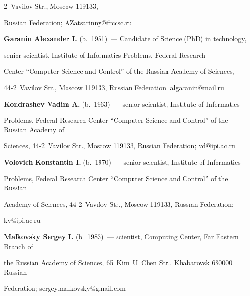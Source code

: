 2~Vavilov Str., Moscow 119133, 

Russian Federation; \mbox{AZatsarinny@frccsc.ru}



\vspace*{3pt}



\noindent

\textbf{Garanin Alexander I.} (b.\ 1951)~--- Candidate of Science (PhD) in technology, 

senior scientist, Institute of Informatics Problems, Federal Research 

Center ``Computer Science and Control'' of the Russian Academy of Sciences, 

 44-2~Vavilov Str., Moscow 119133, Russian Federation; \mbox{algaranin@mail.ru}



\vspace*{3pt}



\noindent

\textbf{Kondrashev Vadim A.} (b.\ 1963)~--- senior scientist, Institute of Informatics 

Problems, Federal Research Center ``Computer Science and Control'' of the Russian Academy of 

Sciences, 44-2~Vavilov Str., Moscow 119133, Russian Federation; \mbox{vd@ipi.ac.ru}



\vspace*{3pt}



\noindent

\textbf{Volovich Konstantin I.} (b.\ 1970)~--- senior scientist, Institute of Informatics 

Problems, Federal Research Center ``Computer Science and Control'' of the Russian 

Academy of Sciences, 44-2~Vavilov Str., Moscow 119133, Russian Federation;  

\mbox{kv@ipi.ac.ru}



\vspace*{3pt}



\noindent

\textbf{Malkovsky Sergey I.} (b.\ 1983)~--- scientist, Computing Center, Far Eastern Branch of 

the Russian Academy of Sciences, 65~Kim~U~Chen Str., Khabarovsk 680000, Russian 

Federation; \mbox{sergey.malkovsky@gmail.com} 





\label{end\stat}





\renewcommand{\bibname}{\protect\rm Литература}

